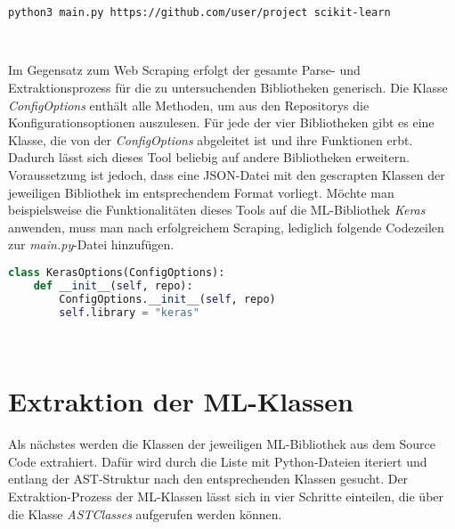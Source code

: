 \documentclass[german,bachelor]{swsLeipzig}
\begin{document}
\noindent\begin{minipage}{\linewidth}
\begin{lstlisting}[language=bash, frame=single, label=execute_coop, basicstyle=\small, caption={Kommandozeilenbefehl für die Extraktion von Konfigurationsoptionen von scikit-learn},captionpos=b]
python3 main.py https://github.com/user/project scikit-learn
\end{lstlisting}
\end{minipage}
\

Im Gegensatz zum Web Scraping erfolgt der gesamte Parse- und Extraktionsprozess für die zu untersuchenden Bibliotheken generisch.
Die Klasse \textit{ConfigOptions} enthält alle Methoden, um aus den Repositorys die Konfigurationsoptionen auszulesen.
Für jede der vier Bibliotheken gibt es eine Klasse, die von der \textit{ConfigOptions} abgeleitet ist und ihre Funktionen erbt.
Dadurch lässt sich dieses Tool beliebig auf andere Bibliotheken erweitern.
Voraussetzung ist jedoch, dass eine JSON-Datei mit den gescrapten Klassen der jeweiligen Bibliothek im entsprechendem Format vorliegt.
Möchte man beispielsweise die Funktionalitäten dieses Tools auf die ML-Bibliothek \textit{Keras} anwenden, muss man nach erfolgreichem Scraping,
lediglich folgende Codezeilen zur \textit{main.py}-Datei hinzufügen.\\

\noindent\begin{minipage}{\linewidth}
\begin{lstlisting}[language=Python, frame=single, label=keras,  basicstyle=\small, caption={Implementation einer Klasse zur Extraktion von Konfigurationsoptionen einer weiteren ML-Bibliothek},captionpos=b]
class KerasOptions(ConfigOptions):
    def __init__(self, repo):
        ConfigOptions.__init__(self, repo)
        self.library = "keras"
\end{lstlisting}
\end{minipage}
\

\section{Extraktion der ML-Klassen}\label{Classes}
Als nächstes werden die Klassen der jeweiligen ML-Bibliothek aus dem Source Code extrahiert.
Dafür wird durch die Liste mit Python-Dateien iteriert und entlang der AST-Struktur nach den entsprechenden Klassen gesucht.
Der Extraktion-Prozess der ML-Klassen lässt sich in vier Schritte einteilen, die über die Klasse
\textit{ASTClasses} aufgerufen werden können.
\end{document}
